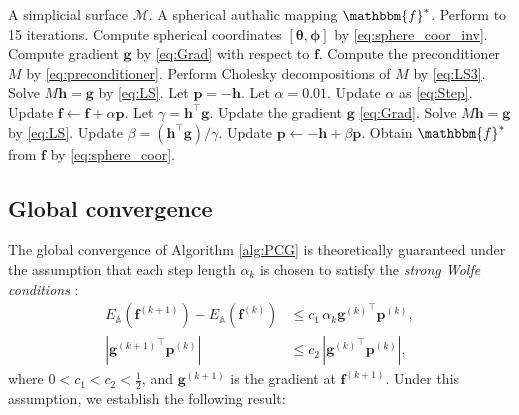 \documentclass{article}
\numberwithin{equation}{section}
\def\f{\mathbf{f}}
\def\bf{\mathbbm{f}}
\def\g{\mathbf{g}}
\def\h{\mathbf{h}}
\def\p{\mathbf{p}}
\def\bbA{\mathbb{A}}
\def\M{\mathcal{M}}
\def\bphi{{\boldsymbol{\phi}}}
\def\btheta{{\boldsymbol{\theta}}}
\begin{document}
\begin{algorithm}[ht]
\caption{Preconditioned nonlinear CG method for spherical authalic mapping}
\label{alg:PCG}
\begin{algorithmic}[1]
\Require A simplicial surface $\M$.
\Ensure A spherical authalic mapping $\bf^*$.
\State Perform \cite[Algorithm 4.3]{YuLL19} to 15 iterations.
\State Compute spherical coordinates $[\btheta, \bphi]$ by \eqref{eq:sphere_coor_inv}.
\State Compute gradient $\g$ by \eqref{eq:Grad} with respect to $\f$.
\State Compute the preconditioner $M$ by \eqref{eq:preconditioner}.
\State Perform Cholesky decompositions of $M$ by \eqref{eq:LS3}.
\State Solve $M\h = \g$ by \eqref{eq:LS}.
\State Let $\p = -\h$.
\State Let $\alpha = 0.01$.
    \State Update $\alpha$ as \eqref{eq:Step}.
    \State Update $\f \leftarrow \f + \alpha \p$.
    \State Let $\gamma = \h^\top \g$.
    \State Update the gradient $\g$ \eqref{eq:Grad}.
    \State Solve $M\h = \g$ by \eqref{eq:LS}.
    \State Update $\beta = (\h^{\top} \g) / \gamma$.
    \State Update $\p \gets -\h + \beta \p$.
\EndWhile
\State Obtain $\bf^*$ from $\f$ by \eqref{eq:sphere_coor}.
\end{algorithmic}
\end{algorithm}

\subsection{Global convergence}
The global convergence of Algorithm \ref{alg:PCG} is theoretically guaranteed under the assumption that each step length $\alpha_k$ is chosen to satisfy the {{\it strong Wolfe conditions} \cite[Chapter 3.1]{NoWr06}}:
\begin{subequations} \label{eq:Wolfe}
\begin{align}
{ E_\bbA(\f^{(k+1)}) - E_\bbA (\f^{(k)}) }& \leq  c_1 \, \alpha_k {\g^{(k)}}^{\top} \p^{(k)}, \label{eq:Wolfe1} \\
|{\g^{(k+1)}}^{\top}  \p^{(k)}| & \leq c_2 \, | {\g^{(k)}}^{\top} \p^{(k)}|, \label{eq:Wolfe2}
\end{align}
\end{subequations}
where $0 < c_1 < c_2 < \frac{1}{2}$, and $\g^{(k+1)}$ is the gradient at $\f^{(k+1)}$. 
Under this assumption, we establish the following result:
\end{document}
